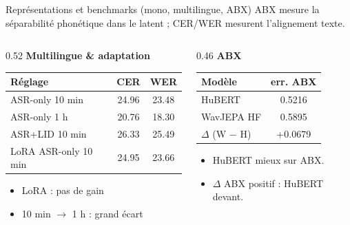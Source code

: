 \documentclass[aspectratio=169]{beamer}
\begin{document}
\begin{frame}{Représentations et benchmarks (mono, multilingue, ABX)}
\small ABX mesure la séparabilité phonétique dans le latent ; CER/WER mesurent l’alignement texte.

\vspace{0.3em}
\begin{columns}[T]
\begin{column}{0.52\textwidth}
\textbf{Multilingue \& adaptation} \\
\small
\begin{tabular}{@{}lcc@{}}
\toprule
Réglage & CER & WER \\
\midrule
ASR-only 10 min & 24.96 & 23.48 \\
ASR-only 1 h & 20.76 & 18.30 \\
ASR+LID 10 min & 26.33 & 25.49 \\
LoRA ASR-only 10 min & 24.95 & 23.66 \\
\bottomrule
\end{tabular}

\vspace{0.2em}
\small
\begin{itemize}\setlength\itemsep{0.1em}
\item LoRA : pas de gain
\item 10 min $\rightarrow$ 1 h : grand écart
\end{itemize}
\end{column}
\begin{column}{0.46\textwidth}
\textbf{ABX} \\
\vspace{0.2em}
\begin{tabular}{@{}lc@{}}
\toprule
Modèle & err. ABX \\
\midrule
HuBERT & 0.5216 \\
WavJEPA HF & 0.5895 \\
$\Delta$ (W $-$ H) & +0.0679 \\
\bottomrule
\end{tabular}

\vspace{0.2em}
\small
\begin{itemize}\setlength\itemsep{0.1em}
\item HuBERT mieux sur ABX.
\item $\Delta$ ABX positif : HuBERT devant.
\end{itemize}
\end{column}
\end{columns}
\end{frame}
\end{document}
